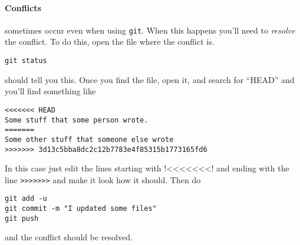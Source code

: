 \documentclass{ximera}
\begin{document}
\paragraph{Conflicts} sometimes occur even when using \verb!git!. When this
happens you'll need to \textit{resolve} the conflict. To do this, open the file
where the conflict is.
\begin{verbatim}
git status
\end{verbatim}
should tell you this. Once you find the file, open it, and search for ``HEAD'' and you'll find something like
\begin{verbatim}
<<<<<<< HEAD
Some stuff that some person wrote.
=======
Some other stuff that someone else wrote
>>>>>>> 3d13c5bba8dc2c12b7783e4f85315b1773165fd6
\end{verbatim}
In this case just edit the lines starting with !<<<<<<<! and ending with the line \verb!>>>>>>>! and make it look how it should.
Then do
\begin{verbatim}
git add -u
git commit -m "I updated some files"
git push
\end{verbatim}
and the conflict should be resolved.


\end{document}
